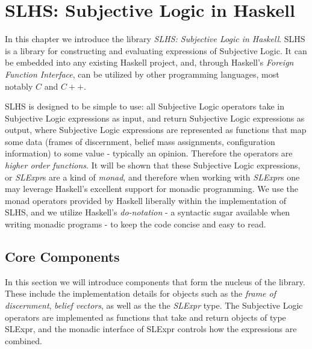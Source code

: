 \documentclass[thesis.tex]{subfiles}
\begin{document}
\chapter{SLHS: Subjective Logic in Haskell}
\label{chap:sl-in-haskell}



In this chapter we introduce the library \emph{SLHS:
  Subjective Logic in Haskell}. SLHS is a library
for constructing and evaluating expressions of Subjective Logic. It
can be embedded into any existing Haskell project, and, through
Haskell's \emph{Foreign Function Interface}, can be utilized by other
programming languages, most notably $C$ and $C++$.

SLHS is designed to be simple to use: all Subjective Logic operators
take in Subjective Logic expressions as input, and return Subjective Logic expressions as output,
where Subjective Logic expressions are represented as functions that map some data
(frames of discernment, belief mass assignments, configuration information) to
some value - typically an opinion. Therefore the operators are \emph{higher order functions}.
It will be shown that these Subjective Logic expressions, or \emph{SLExpr}s are a
kind of \emph{monad}, and therefore when working with \emph{SLExpr}s one may leverage
Haskell's excellent support for monadic programming. We use the monad operators provided by Haskell liberally
within the implementation of SLHS, and we utilize Haskell's \emph{do-notation} - a syntactic sugar available
when writing monadic programs - to keep the code concise and easy to read.


\section{Core Components}

In this section we will introduce components that form the nucleus of the library. These include the implementation details
for objects such as the \emph{frame of discernment}, \emph{belief vectors}, as well as the the \emph{SLExpr} type.
The Subjective Logic operators are implemented as functions that take and return objects of type SLExpr, and the
monadic interface of SLExpr controls how the expressions are combined.




\end{document}
